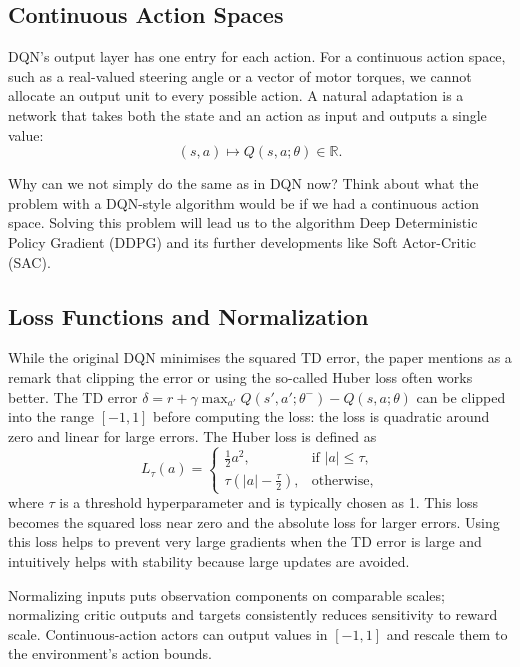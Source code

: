 \documentclass[11pt,a4paper]{article}
\begin{document}
\subsection{Continuous Action Spaces}
DQN's output layer has one entry for each action. For a continuous
action space, such as a real-valued steering angle or a vector of motor torques,
we cannot allocate an output unit to every possible action. A natural adaptation
is a network that takes both the state and an action as input and outputs a
single value:
\begin{equation}
 (s,a)\longmapsto Q(s,a;\theta)\in\mathbb R.
\end{equation}
\begin{idea}{Why can we not simply do the same as in DQN now?}
Think about what the problem with a DQN-style algorithm would be if we had a continuous action space. Solving this problem will lead us to 
the algorithm Deep Deterministic Policy Gradient (DDPG) and its further developments like Soft Actor-Critic (SAC).
\end{idea}

\subsection{Loss Functions and Normalization}
While the original DQN minimises the squared TD error, the paper mentions
as a remark that clipping the error or using the so-called Huber loss often works
better. The TD error $\delta=r+\gamma\max_{a'}Q(s',a';\theta^-)-Q(s,a;\theta)$
can be clipped into the range $[-1,1]$ before computing the loss: the loss is
quadratic around zero and linear for large errors. The Huber loss is defined as
\begin{equation}
 L_\tau(a)=\begin{cases}
 \frac12 a^2,&\text{if }|a|\leq\tau,\\
 \tau(|a|-\frac\tau2),&\text{otherwise},
 \end{cases}
\end{equation}
where $\tau$ is a threshold hyperparameter and is typically chosen as 1. This
loss becomes the squared loss near zero and the absolute loss for larger errors.
Using this loss helps to prevent very large gradients when the TD error is large
and intuitively helps with stability because large updates are avoided.

Normalizing inputs puts observation components on comparable scales; normalizing
critic outputs and targets consistently reduces sensitivity to reward scale.
Continuous-action actors can output values in $[-1,1]$ and rescale them to the
environment's action bounds.
\end{document}
